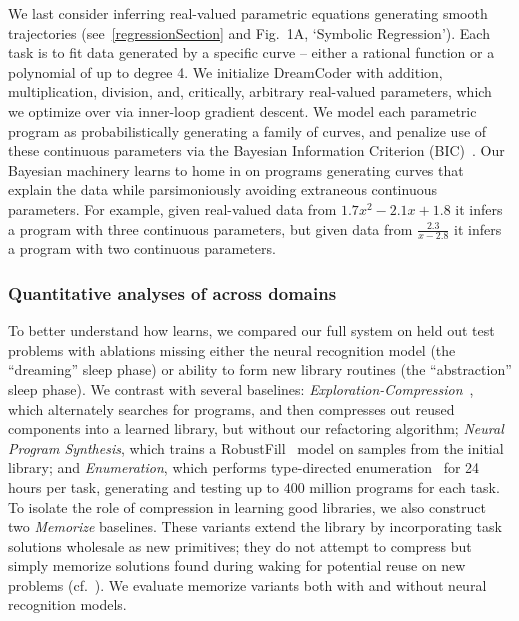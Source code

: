 \documentclass[12pt]{article}
\begin{document}
We last consider inferring real-valued parametric equations generating smooth trajectories (see~\ref{regressionSection} and Fig.~1A, `Symbolic Regression').
Each task is to fit data generated by a specific curve -- %
either a rational function or a polynomial of up to degree 4.
We initialize DreamCoder with addition, multiplication, division,
and, critically,
arbitrary real-valued parameters,
which we optimize over via inner-loop gradient descent.
We model each parametric program as probabilistically generating a
family of curves,
and penalize use of these continuous parameters via the
Bayesian Information Criterion (BIC)~\cite{Bishop:2006:PRM:1162264}.
Our Bayesian machinery learns to home in on programs generating
curves that explain the data while parsimoniously avoiding extraneous continuous parameters.
For example, given real-valued data from $1.7x^2 - 2.1x + 1.8$ it infers a
program with three continuous parameters, but given
data from $\frac{2.3}{x - 2.8}$ it infers a program with two continuous parameters.

\subsubsection*{Quantitative analyses of \system across domains}\label{quantitative}
To better understand how \system learns,
we compared our full system on held out test problems with ablations missing either the neural recognition model (the ``dreaming'' sleep phase) or ability to form new library routines (the ``abstraction'' sleep phase).
We contrast with several baselines:
\emph{Exploration-Compression}~\cite{Dechter:2013:BLV:2540128.2540316},
which alternately searches for programs,
and then compresses out reused components into a learned library,
but without our refactoring algorithm;
\emph{Neural Program Synthesis},
which trains a RobustFill~\cite{devlin2017robustfill} model on
samples from the initial library; %
and \emph{Enumeration},
which performs type-directed enumeration~\cite{feser2015synthesizing}
for 24 hours per task,
generating and testing up to
$400$ million programs for each task.
To isolate the role of compression %
in learning good libraries,
we also construct two \emph{Memorize} baselines.
These variants extend the library by incorporating task solutions wholesale as new primitives; they do not attempt to compress but simply memorize
solutions found during waking for potential reuse on new problems (cf.~\cite{cropperplaygol}).
We evaluate memorize variants both with and without neural recognition models.
\end{document}

